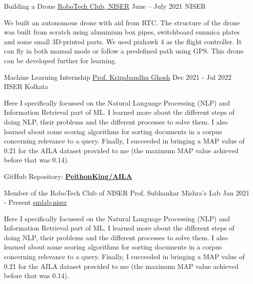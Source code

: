 	\cvevent
	{Building a Drone}
	{\href{https://www.niser.ac.in/~smishra/club/rtc/}{RoboTech Club, NISER}}
	{June -- July 2021}
	{NISER}

	\begin{justify}
		\hspace{5mm} We built an autonomous drone with aid from RTC. The structure of the drone was built from scratch using aluminium box pipes, switchboard sunmica plates and some small 3D-printed parts. We used pixhawk 4 as the flight controller. It can fly in both manual mode or follow a predefined path using GPS. This drone can be developed further for learning.
	\end{justify}
	\divider


	\cvevent
	{Machine Learning Internship}
	{\href{https://www.iiserkol.ac.in/web/en/people/faculty/cds/kripaghosh}{Prof. Kripabandhu Ghosh}}
	{Dec 2021 - Jul 2022}
	{IISER Kolkata}

	\begin{justify}
		\hspace{5mm} Here I specifically focussed on the Natural Language Processing (NLP) and Information Retrieval part of ML. I learned more about the different steps of doing NLP, their problems and the different processes to solve them. I also learned about some scoring algorithms for sorting documents in a corpus concerning relevance to a query. Finally, I succeeded in bringing a MAP value of 0.21 for the AILA dataset provided to me (the maximum MAP value achieved before that was 0.14).

		GitHub Repository: \href{https://github.com/PeithonKing/AILA}{\textbf{PeithonKing/AILA}}
	\end{justify}
	\divider


	\cvevent
	{Member of the RoboTech Club of NISER}
	{Prof. Subhankar Mishra's Lab}
	{Jan 2021 - Present}
	{\href{https://github.com/smlab-niser}{smlab-niser}}

	\begin{justify}
		\hspace{5mm} Here I specifically focussed on the Natural Language Processing (NLP) and Information Retrieval part of ML. I learned more about the different steps of doing NLP, their problems and the different processes to solve them. I also learned about some scoring algorithms for sorting documents in a corpus concerning relevance to a query. Finally, I succeeded in bringing a MAP value of 0.21 for the AILA dataset provided to me (the maximum MAP value achieved before that was 0.14).
	\end{justify}

